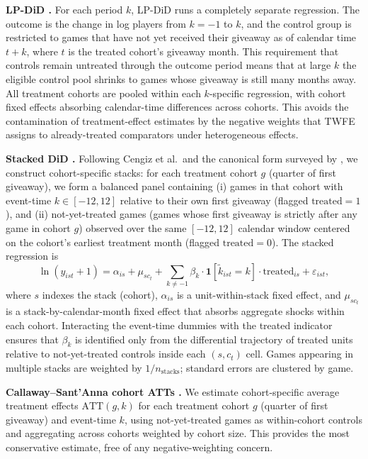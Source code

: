 \documentclass[11pt]{article}
\begin{document}
\textbf{LP-DiD \citep{dube2023}.} For each period $k$, LP-DiD runs a completely
separate regression. The outcome is the change in log players from $k = -1$ to $k$,
and the control group is restricted to games that have not yet received their giveaway
as of calendar time $t + k$, where $t$ is the treated cohort's giveaway month. This
requirement that controls remain untreated through the outcome period means that at
large $k$ the eligible control pool shrinks to games whose giveaway is still many
months away. All treatment cohorts are pooled within each $k$-specific regression,
with cohort fixed effects absorbing calendar-time differences across cohorts. This
avoids the contamination of treatment-effect estimates by the negative weights that
TWFE assigns to already-treated comparators under heterogeneous effects.

\textbf{Stacked DiD \citep{cengiz2019}.} Following Cengiz et al.\ and the canonical
form surveyed by \citet{bakerlarckerwang2022}, we construct cohort-specific stacks:
for each treatment cohort $g$ (quarter of first giveaway), we form a balanced panel
containing (i) games in that cohort with event-time $k \in [-12, 12]$ relative to
their own first giveaway (flagged $\text{treated} = 1$), and (ii) not-yet-treated
games (games whose first giveaway is strictly after any game in cohort $g$) observed
over the same $[-12, 12]$ calendar window centered on the cohort's earliest treatment
month (flagged $\text{treated} = 0$). The stacked regression is
\begin{equation*}
\ln(y_{ist} + 1)
= \alpha_{is}
+ \mu_{sc_t}
+ \sum_{k \neq -1} \beta_k \cdot \mathbf{1}[\tilde k_{ist} = k] \cdot \text{treated}_{is}
+ \varepsilon_{ist},
\end{equation*}
where $s$ indexes the stack (cohort), $\alpha_{is}$ is a unit-within-stack fixed
effect, and $\mu_{sc_t}$ is a stack-by-calendar-month fixed effect that absorbs
aggregate shocks within each cohort. Interacting the event-time dummies with
the treated indicator ensures that $\beta_k$ is identified only from the differential
trajectory of treated units relative to not-yet-treated controls inside each
$(s, c_t)$ cell. Games appearing in multiple stacks are weighted by $1/n_{\text{stacks}}$;
standard errors are clustered by game.

\textbf{Callaway--Sant'Anna cohort ATTs \citep{callaway2021}.} We estimate
cohort-specific average treatment effects $\text{ATT}(g, k)$ for each treatment cohort
$g$ (quarter of first giveaway) and event-time $k$, using not-yet-treated games as
within-cohort controls and aggregating across cohorts weighted by cohort size. This
provides the most conservative estimate, free of any negative-weighting concern.
\end{document}
